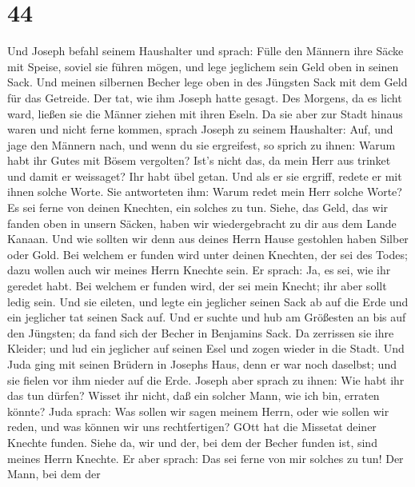 \hypertarget{section-43}{%
\section{44}\label{section-43}}

 Und Joseph befahl seinem Haushalter und sprach: Fülle den
Männern ihre Säcke mit Speise, soviel sie führen mögen, und lege
jeglichem sein Geld oben in seinen Sack.  Und meinen
silbernen Becher lege oben in des Jüngsten Sack mit dem Geld für das
Getreide. Der tat, wie ihm Joseph hatte gesagt.  Des
Morgens, da es licht ward, ließen sie die Männer ziehen mit ihren Eseln.
 Da sie aber zur Stadt hinaus waren und nicht ferne kommen,
sprach Joseph zu seinem Haushalter: Auf, und jage den Männern nach, und
wenn du sie ergreifest, so sprich zu ihnen: Warum habt ihr Gutes mit
Bösem vergolten?  Ist's nicht das, da mein Herr aus trinket
und damit er weissaget? Ihr habt übel getan.  Und als er sie
ergriff, redete er mit ihnen solche Worte.  Sie antworteten
ihm: Warum redet mein Herr solche Worte? Es sei ferne von deinen
Knechten, ein solches zu tun.  Siehe, das Geld, das wir
fanden oben in unsern Säcken, haben wir wiedergebracht zu dir aus dem
Lande Kanaan. Und wie sollten wir denn aus deines Herrn Hause gestohlen
haben Silber oder Gold.  Bei welchem er funden wird unter
deinen Knechten, der sei des Todes; dazu wollen auch wir meines Herrn
Knechte sein.  Er sprach: Ja, es sei, wie ihr geredet habt.
Bei welchem er funden wird, der sei mein Knecht; ihr aber sollt ledig
sein.  Und sie eileten, und legte ein jeglicher seinen Sack
ab auf die Erde und ein jeglicher tat seinen Sack auf.  Und
er suchte und hub am Größesten an bis auf den Jüngsten; da fand sich der
Becher in Benjamins Sack.  Da zerrissen sie ihre Kleider;
und lud ein jeglicher auf seinen Esel und zogen wieder in die Stadt.
 Und Juda ging mit seinen Brüdern in Josephs Haus, denn er
war noch daselbst; und sie fielen vor ihm nieder auf die Erde.
 Joseph aber sprach zu ihnen: Wie habt ihr das tun dürfen?
Wisset ihr nicht, daß ein solcher Mann, wie ich bin, erraten könnte?
 Juda sprach: Was sollen wir sagen meinem Herrn, oder wie
sollen wir reden, und was können wir uns rechtfertigen? GOtt hat die
Missetat deiner Knechte funden. Siehe da, wir und der, bei dem der
Becher funden ist, sind meines Herrn Knechte.  Er aber
sprach: Das sei ferne von mir solches zu tun! Der Mann, bei dem der
